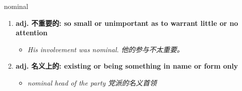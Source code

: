
\begin{frame}
{\huge nominal}
\begin{center}
\begin{enumerate}\Large
  \item \textbf{adj. 不重要的: so small or unimportant as to warrant little or no attention}
  \begin{itemize}
    \item \em{\Large{His involvement was nominal. 他的参与不太重要。}}
  \end{itemize}
  \item \textbf{adj. 名义上的: existing or being something in name or form only}
  \begin{itemize}
    \item \em{\Large{nominal head of the party 党派的名义首领}}
  \end{itemize}
\end{enumerate}
\end{center}
\end{frame}
